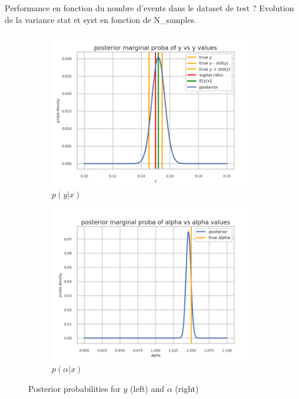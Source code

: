Performance en fonction du nombre d'events dans le dataset de test ?
Evolution de la variance stat et syst en fonction de N\_samples.


\begin{figure}[htb]
  \centering
  \begin{subfigure}[t]{0.49\linewidth}
    \includegraphics[width=\linewidth]{minitoy/marginal_y.png}
    \caption{$p(y|x)$}
    \label{fig:marginal_y}
  \end{subfigure}%
  \hfill
  \begin{subfigure}[t]{0.49\linewidth}
    \includegraphics[width=\linewidth]{minitoy/marginal_alpha.png}
    \caption{$p(\alpha|x)$}
    \label{fig:marginal_alpha}
  \end{subfigure}
  \caption{Posterior probabilities for $y$ (left) and $\alpha$ (right)}
  \label{fig:marginals}
\end{figure}

